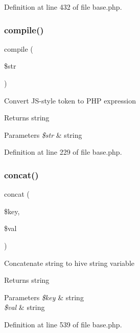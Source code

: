 Definition at line 432 of file base.\+php.

\hypertarget{class_base_af206a5f3197cfe2acbbb071ec086b710}{}\label{class_base_af206a5f3197cfe2acbbb071ec086b710} 
\subsubsection{\texorpdfstring{compile()}{compile()}}
{\footnotesize\ttfamily compile (\begin{DoxyParamCaption}\item[{}]{\$str }\end{DoxyParamCaption})}

Convert J\+S-\/style token to P\+HP expression \begin{DoxyReturn}{Returns}
string 
\end{DoxyReturn}

\begin{DoxyParams}{Parameters}
{\em \$str} & string \\
\hline
\end{DoxyParams}


Definition at line 229 of file base.\+php.

\hypertarget{class_base_ac750abed7c77c34dab7894d272a2a293}{}\label{class_base_ac750abed7c77c34dab7894d272a2a293} 
\subsubsection{\texorpdfstring{concat()}{concat()}}
{\footnotesize\ttfamily concat (\begin{DoxyParamCaption}\item[{}]{\$key,  }\item[{}]{\$val }\end{DoxyParamCaption})}

Concatenate string to hive string variable \begin{DoxyReturn}{Returns}
string 
\end{DoxyReturn}

\begin{DoxyParams}{Parameters}
{\em \$key} & string \\
\hline
{\em \$val} & string \\
\hline
\end{DoxyParams}


Definition at line 539 of file base.\+php.

